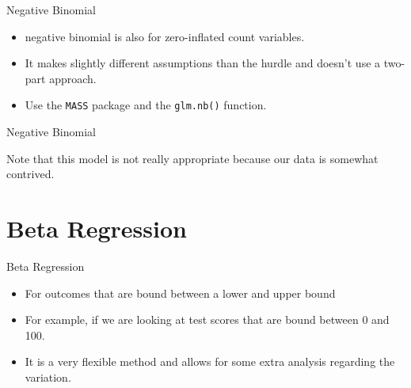 \begin{frame}[fragile]{Negative Binomial}

\large

\begin{itemize}
\tightlist
\item
  negative binomial is also for zero-inflated count variables.
\item
  It makes slightly different assumptions than the hurdle and doesn't
  use a two-part approach.
\item
  Use the \texttt{MASS} package and the \texttt{glm.nb()} function.
\end{itemize}

\small

\begin{Shaded}
\begin{Highlighting}[]
\StringTok{ }\OperatorTok{~}\StringTok{ }\OperatorTok{+}\StringTok{ }\OperatorTok{+}\StringTok{ }
\end{Highlighting}
\end{Shaded}

\end{frame}

\begin{frame}{Negative Binomial}

\small

\Large

Note that this model is not really appropriate because our data is
somewhat contrived.

\end{frame}

\section{Beta Regression}\label{beta-regression}

\begin{frame}{Beta Regression}

\large

\begin{itemize}
\tightlist
\item
  For outcomes that are bound between a lower and upper bound
\item
  For example, if we are looking at test scores that are bound between 0
  and 100.
\item
  It is a very flexible method and allows for some extra analysis
  regarding the variation.
\end{itemize}

\end{frame}


